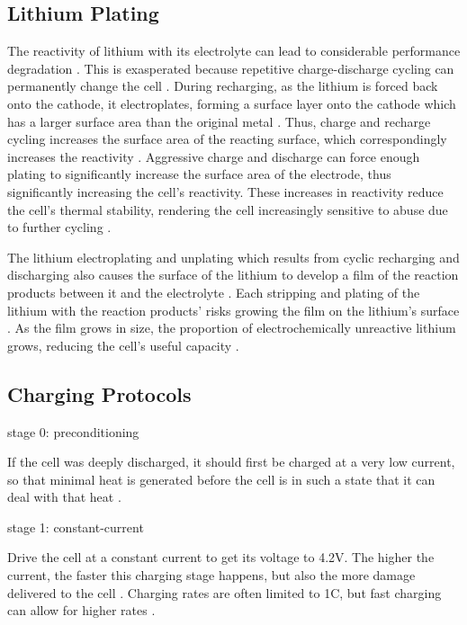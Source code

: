 \subsection{Lithium Plating}
The reactivity of lithium with its electrolyte can lead to considerable performance degradation \cite{HANDBOOK}. 
This is exasperated because repetitive charge-discharge cycling can permanently change the cell \cite{HANDBOOK}.
During recharging, as the lithium is forced back onto the cathode, it electroplates, forming a surface layer onto the cathode which has a larger surface area than the original metal \cite{HANDBOOK}. 
Thus, charge and recharge cycling increases the surface area of the reacting surface, which correspondingly increases the reactivity \cite{HANDBOOK}. 
Aggressive charge and discharge can force enough plating to significantly increase the surface area of the electrode, thus significantly increasing the cell's reactivity.
These increases in reactivity reduce the cell's thermal stability, rendering the cell increasingly sensitive to abuse due to further cycling \cite{HANDBOOK}.

The lithium electroplating and unplating which results from cyclic recharging and discharging also causes the surface of the lithium to develop a film of the reaction products between it and the electrolyte \cite{HANDBOOK}. 
Each stripping and plating of the lithium with the reaction products' risks growing the film on the lithium's surface \cite{HANDBOOK}. 
As the film grows in size, the proportion of electrochemically unreactive lithium grows, reducing the cell's useful capacity \cite{HANDBOOK}.

\subsection{Charging Protocols}

stage 0: preconditioning

If the cell was deeply discharged, it should first be charged at a very low current, so that minimal heat is generated before the cell is in such a state that it can deal with that heat \cite{DIGIKEY}.

stage 1: constant-current 

Drive the cell at a constant current to get its voltage to 4.2V. The higher the current, the faster this charging stage happens, but also the more damage delivered to the cell \cite{TI}. Charging rates are often limited to 1C, but fast charging can allow for higher rates \cite{TI}.

